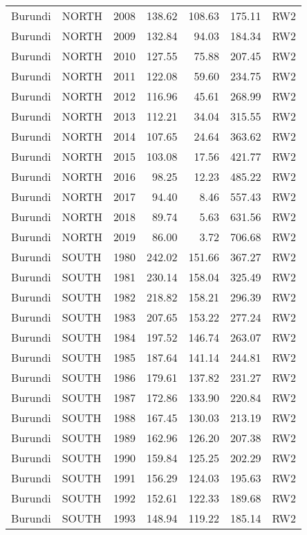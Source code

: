\begin{longtable}{lllrrrl}
  Burundi & NORTH & 2008 & 138.62 & 108.63 & 175.11 & RW2 \\ 
  Burundi & NORTH & 2009 & 132.84 & 94.03 & 184.34 & RW2 \\ 
  Burundi & NORTH & 2010 & 127.55 & 75.88 & 207.45 & RW2 \\ 
  Burundi & NORTH & 2011 & 122.08 & 59.60 & 234.75 & RW2 \\ 
  Burundi & NORTH & 2012 & 116.96 & 45.61 & 268.99 & RW2 \\ 
  Burundi & NORTH & 2013 & 112.21 & 34.04 & 315.55 & RW2 \\ 
  Burundi & NORTH & 2014 & 107.65 & 24.64 & 363.62 & RW2 \\ 
  Burundi & NORTH & 2015 & 103.08 & 17.56 & 421.77 & RW2 \\ 
  Burundi & NORTH & 2016 & 98.25 & 12.23 & 485.22 & RW2 \\ 
  Burundi & NORTH & 2017 & 94.40 & 8.46 & 557.43 & RW2 \\ 
  Burundi & NORTH & 2018 & 89.74 & 5.63 & 631.56 & RW2 \\ 
  Burundi & NORTH & 2019 & 86.00 & 3.72 & 706.68 & RW2 \\ 
  Burundi & SOUTH & 1980 & 242.02 & 151.66 & 367.27 & RW2 \\ 
  Burundi & SOUTH & 1981 & 230.14 & 158.04 & 325.49 & RW2 \\ 
  Burundi & SOUTH & 1982 & 218.82 & 158.21 & 296.39 & RW2 \\ 
  Burundi & SOUTH & 1983 & 207.65 & 153.22 & 277.24 & RW2 \\ 
  Burundi & SOUTH & 1984 & 197.52 & 146.74 & 263.07 & RW2 \\ 
  Burundi & SOUTH & 1985 & 187.64 & 141.14 & 244.81 & RW2 \\ 
  Burundi & SOUTH & 1986 & 179.61 & 137.82 & 231.27 & RW2 \\ 
  Burundi & SOUTH & 1987 & 172.86 & 133.90 & 220.84 & RW2 \\ 
  Burundi & SOUTH & 1988 & 167.45 & 130.03 & 213.19 & RW2 \\ 
  Burundi & SOUTH & 1989 & 162.96 & 126.20 & 207.38 & RW2 \\ 
  Burundi & SOUTH & 1990 & 159.84 & 125.25 & 202.29 & RW2 \\ 
  Burundi & SOUTH & 1991 & 156.29 & 124.03 & 195.63 & RW2 \\ 
  Burundi & SOUTH & 1992 & 152.61 & 122.33 & 189.68 & RW2 \\ 
  Burundi & SOUTH & 1993 & 148.94 & 119.22 & 185.14 & RW2 \\ 

\end{longtable}
